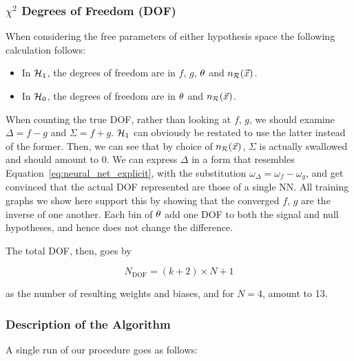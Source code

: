 \documentclass[../../ddppaper2.tex]{subfiles}
\begin{document}
\subsubsection{$\chi^2$ Degrees of Freedom (DOF)}
When considering the free parameters of either hypothesis space the following calculation follows:
\begin{itemize}
    \item In ${\mathcal{H}_{1}}$, the degrees of freedom are in $f$, $g$, ${\theta}$ and $n_{\mathcal{R}}({\vec{{x}}})$.
    \item In ${{\mathcal{H}_{0}}}$, the degrees of freedom are in ${\theta}$ and $n_{\mathcal{R}}({\vec{{x}}})$.
\end{itemize}

When counting the true DOF, rather than looking at $f$, $g$, we should examine $\Delta = f - g$ and $\Sigma = f + g$. ${\mathcal{H}_{1}}$ can obviously be restated to use the latter instead of the former. Then, we can see that by choice of $n_{\mathcal{R}}({\vec{{x}}})$, $\Sigma$ is actually swallowed and should amount to 0. We can express $\Delta$ in a form that resembles Equation~\ref{eq:neural_net_explicit}, with the substitution $\omega_\Delta = \omega_f - \omega_g$, and get convinced that the actual DOF represented are those of a single NN.
All training graphs we show here support this by showing that the converged $f$, $g$ are the inverse of one another.
Each bin of ${\theta}$ add one DOF to both the signal and null hypotheses, and hence does not change the difference.

The total DOF, then, goes by

\begin{equation}
    N_\text{DOF} = (k + 2) \times N + 1
\end{equation}

\noindent as the number of resulting weights and biases, and for $N = 4$, amount to 13.

\subsubsection{Description of the Algorithm}
A single run of our procedure goes as follows:
\end{document}
